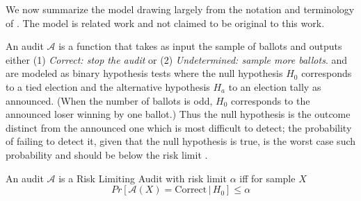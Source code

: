 
We now summarize the model drawing largely from the notation and terminology of \cite{usenix_minerva,arxiv_athena,simulations,bravo}. The model is related work and not claimed to be original to this work. 

An audit $\mathcal{A}$ is a function that takes as input the sample of ballots and outputs either (1) \emph{Correct: stop the audit} or (2) \emph{Undetermined: sample more ballots}.
\BRAVO and \Minerva are modeled as binary hypothesis tests where the null hypothesis $H_0$ corresponds to a tied election and the alternative hypothesis $H_a$ to an election tally as announced. 
(When the number of ballots is odd, $H_0$ corresponds to the announced loser winning by one ballot.)
Thus the null hypothesis is the outcome distinct from the announced one which is most difficult to detect; the probability of failing to detect it, given that the null hypothesis is true, is the worst case such probability and should be below the risk limit \cite{Bayesian-RLA}.

\begin{definition}
An audit $\mathcal{A}$ is a Risk Limiting Audit with 
risk limit $\alpha$ iff for sample $X$
$$
Pr[\mathcal{A}(X) 
= \text{Correct} \,|\, H_0]\le \alpha
$$
\end{definition}

